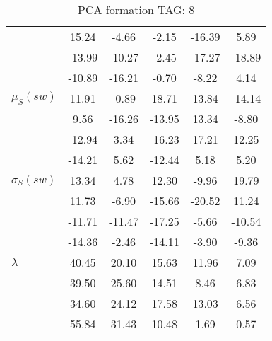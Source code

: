 \begin{table}[h!]
\begin{center}
\begin{tabular}{| l || c | c | c | c | c |}
 & 15.24  & -4.66  & -2.15  & -16.39  & 5.89 \\
 & -13.99  & -10.27  & -2.45  & -17.27  & -18.89 \\
 & -10.89  & -16.21  & -0.70  & -8.22  & 4.14 \\\hline
$\mu_S(sw)$ & 11.91  & -0.89  & 18.71  & 13.84  & -14.14 \\
 & 9.56  & -16.26  & -13.95  & 13.34  & -8.80 \\
 & -12.94  & 3.34  & -16.23  & 17.21  & 12.25 \\
 & -14.21  & 5.62  & -12.44  & 5.18  & 5.20 \\\hline
$\sigma_S(sw)$ & 13.34  & 4.78  & 12.30  & -9.96  & 19.79 \\
 & 11.73  & -6.90  & -15.66  & -20.52  & 11.24 \\
 & -11.71  & -11.47  & -17.25  & -5.66  & -10.54 \\
 & -14.36  & -2.46  & -14.11  & -3.90  & -9.36 \\\hline\hline
$\lambda$ & 40.45  & 20.10  & 15.63  & 11.96  & 7.09 \\
 & 39.50  & 25.60  & 14.51  & 8.46  & 6.83 \\
 & 34.60  & 24.12  & 17.58  & 13.03  & 6.56 \\
 & 55.84  & 31.43  & 10.48  & 1.69  & 0.57 \\\hline
\end{tabular}
\caption{PCA formation TAG: 8}
\end{center}
\end{table}